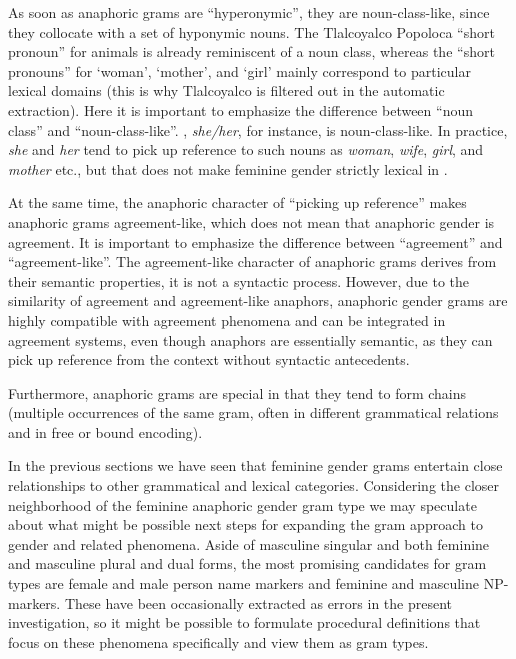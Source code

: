 \documentclass[output=collectionpaper]{langsci/langscibook}
\begin{document}
As soon as anaphoric grams are “hyperonymic”, they are noun-class-like, since they collocate with a set of hyponymic nouns. The Tlalcoyalco Popoloca “short pronoun” for animals is already reminiscent of a noun class, whereas the “short pronouns” for ‘woman’, ‘mother’, and ‘girl’ mainly correspond to particular lexical domains (this is why Tlalcoyalco  is filtered out in the automatic extraction). Here it is important to emphasize the difference between “noun class” and “noun-class-like”. , \textit{she/her}, for instance, is noun-class-like. In practice, \textit{she} and \textit{her} tend to pick up reference to such nouns as \textit{woman}, \textit{wife}, \textit{girl}, and \textit{mother} etc., but that does not make feminine gender strictly lexical in .

At the same time, the anaphoric character of “picking up reference” makes anaphoric grams agreement-like, which does not mean that anaphoric gender is agreement. It is important to emphasize the difference between “agreement” and “agreement-like”. The agreement-like character of anaphoric grams derives from their semantic properties, it is not a syntactic process. However, due to the similarity of agreement and agreement-like anaphors, anaphoric gender grams are highly compatible with agreement phenomena and can be integrated in agreement systems, even though anaphors are essentially semantic, as they can pick up reference from the context without syntactic antecedents.

Furthermore, anaphoric grams are special in that they tend to form chains (multiple occurrences of the same gram, often in different grammatical relations and in free or bound encoding).

In the previous sections we have seen that feminine gender grams entertain close relationships to other grammatical and lexical categories. Considering the closer neighborhood of the feminine anaphoric gender gram type we may speculate about what might be possible next steps for expanding the gram approach to gender and related phenomena. Aside of masculine singular and both feminine and masculine plural and dual forms, the most promising candidates for gram types are female and male person name markers and feminine and masculine NP-markers. These have been occasionally extracted as errors in the present investigation, so it might be possible to formulate procedural definitions that focus on these phenomena specifically and view them as gram types.
\end{document}
